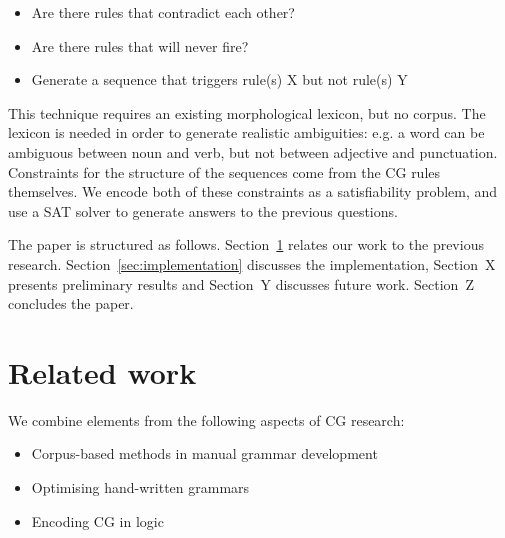 \begin{itemize}
\item Are there rules that contradict each other?
\item Are there rules that will never fire?
\item Generate a sequence that triggers rule(s) X but not rule(s) Y
\end{itemize}

This technique requires an existing morphological lexicon, but no corpus. 
The lexicon is needed in order to generate realistic ambiguities: e.g. a word can be ambiguous between noun and verb, but not between adjective and punctuation. 
Constraints for the structure of the sequences come from the CG rules themselves.
We encode both of these constraints as a satisfiability problem, and use a SAT solver to generate answers to the previous questions.

The paper is structured as follows. Section~\ref{sec:prev} relates our work to the previous research. Section~\ref{sec:implementation} discusses the implementation, Section~X presents preliminary results and  Section~Y discusses future work. Section~Z concludes the paper.







\section{Related work}
\label{sec:prev}


We combine elements from the following aspects of CG research:

\begin{itemize}
\item Corpus-based methods in manual grammar development \cite{voutilainen2004}
\item Optimising hand-written grammars \cite{bick2013tuning}
\item Encoding CG in logic \cite{lager98,lager_nivre01,listenmaa_claessen2015}
\end{itemize}

